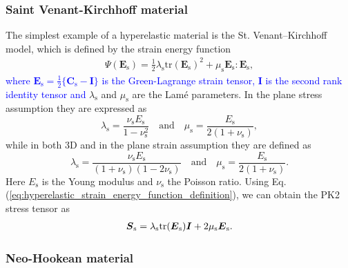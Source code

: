 \documentclass[11pt,english]{article}
\begin{document}
\subsubsection{Saint Venant-Kirchhoff material} \label{subsec:Saint-Venant-Kirchhoff}

The simplest example of a hyperelastic material is the St. Venant--Kirchhoff model, which is defined by the strain energy function
\begin{align*}
    \Psi (\boldsymbol{E}_{\mathrm{s}}) = \frac{1}{2}\lambda_{\mathrm{s}}\mathrm{tr} (\boldsymbol{E}_{\mathrm{s}})^2+\mu_{\mathrm{s}}\boldsymbol{E_{\mathrm{s}}}:\boldsymbol{E_{\mathrm{s}}}, 
\end{align*}
\textcolor{blue}{where $\boldsymbol{E}_{\mathrm{s}}=\frac{1}{2} \lbrace \boldsymbol{C}_{\mathrm{s}} - \boldsymbol{I} \rbrace$ is the Green-Lagrange strain tensor, $\boldsymbol{I}$ is the second rank identity tensor and} $\lambda_{\mathrm{s}}$ and $\mu_{\mathrm{s}}$ are the Lam\'e parameters. In the plane stress assumption they are expressed as
\begin{equation*}
   \lambda_{\mathrm{s}} = \frac{\nu_{\mathrm{s}} E_{\mathrm{s}}}{1-\nu_{\mathrm{s}}^2} \quad \text{and} \quad \mu_{\mathrm{s}} = \frac{E_{\mathrm{s}}}{2(1+\nu_{\mathrm{s}})}, \label{eq:lame's_parameters_plane_stress}
\end{equation*}
while in both 3D and in the plane strain assumption they are defined as
\begin{equation*}
   \lambda_{\mathrm{s}} = \frac{\nu_{\mathrm{s}} E_{\mathrm{s}}}{(1+\nu_{\mathrm{s}})(1-2\nu_{\mathrm{s}})} \quad \text{and} \quad \mu_{\mathrm{s}} = \frac{E_{\mathrm{s}}}{2(1+\nu_{\mathrm{s}})}. \label{eq:lame's_parameters_plane_strain}
\end{equation*} 
Here $E_{\mathrm{s}}$ is the Young modulus and $\nu_{\mathrm{s}}$ the Poisson ratio. Using Eq. (\ref{eq:hyperelastic_strain_energy_function_definition}), we can obtain the PK2 stress tensor as
\begin{align*} %
    \boldsymbol{S}_{\rm{s}} = \lambda_{\mathrm{s}} \mathrm{tr} (\boldsymbol{E}_{\mathrm{s}}) \boldsymbol{I} + 2\mu_{\mathrm{s}} \boldsymbol{E}_{\mathrm{s}}.
\end{align*}

\subsubsection{Neo-Hookean material\label{subsec:Neohookean}}
\end{document}
